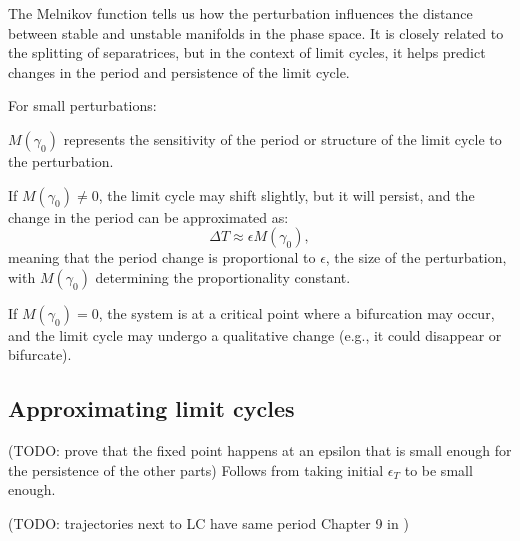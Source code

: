 \documentclass{article}
\newcommand{\ascomment}[1]{\textcolor{ascolor}{(#1)}}
\theoremstyle{definition} \newtheorem{definition}{Definition}
\theoremstyle{remark} \newtheorem{remark}{Remark}
\newcommand{\boa}{\operatorname{BoA}}
\newcounter{ct}
\begin{document}
The Melnikov function tells us how the perturbation influences the distance between stable and unstable manifolds in the phase space. It is closely related to the splitting of separatrices, but in the context of limit cycles, it helps predict changes in the period and persistence of the limit cycle.

For small perturbations:

\(M(\gamma_0)\) represents the sensitivity of the period or structure of the limit cycle to the perturbation.

If \(M(\gamma_0) \neq 0\), the limit cycle may shift slightly, but it will persist, and the change in the period can be approximated as:
\[
\Delta T \approx \epsilon M(\gamma_0),
\]
meaning that the period change is proportional to \(\epsilon\), the size of the perturbation, with \(M(\gamma_0)\) determining the proportionality constant.

If \(M(\gamma_0) = 0\), the system is at a critical point where a bifurcation may occur, and the limit cycle may undergo a qualitative change (e.g., it could disappear or bifurcate).


\subsection{Approximating limit cycles}\label{sec:lc_extras}
\ascomment{TODO: prove that the fixed point happens at an epsilon that is small enough for the persistence of the other parts}
Follows from taking initial $\epsilon_T$ to be small enough.

\ascomment{TODO: trajectories next to LC have same period Chapter 9 in \citep{ermentrout2010mathematical}}



%
%
%
\end{document}
